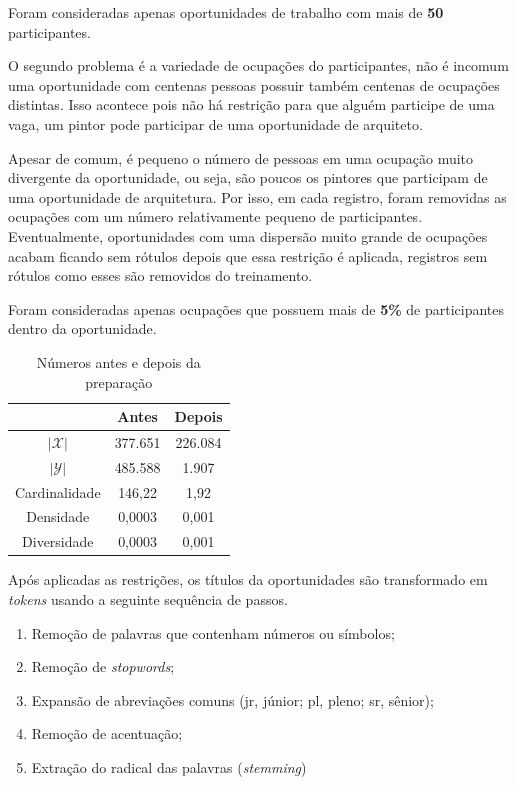 \documentclass[runningheads,a4paper]{llncs}
\begin{document}
Foram consideradas apenas oportunidades de trabalho com mais de \textbf{50} participantes.

O segundo problema é a variedade de ocupações do participantes, não é incomum uma oportunidade com centenas pessoas possuir também centenas de ocupações distintas. Isso acontece pois não há restrição para que alguém participe de uma vaga, um pintor pode participar de uma oportunidade de arquiteto.

Apesar de comum, é pequeno o número de pessoas em uma ocupação muito divergente da oportunidade, ou seja, são poucos os pintores que participam de uma oportunidade de arquitetura. Por isso, em cada registro, foram removidas as ocupações com um número relativamente pequeno de participantes. Eventualmente, oportunidades com uma dispersão muito grande de ocupações acabam ficando sem rótulos depois que essa restrição é aplicada, registros sem rótulos como esses são removidos do treinamento.

Foram consideradas apenas ocupações que possuem mais de \textbf{5\%} de participantes dentro da oportunidade.

\begin{table}
	\centering
	\begin{tabular}{| c | c | c |}
		\hline
		& \textbf{Antes} & \textbf{Depois} \\
		\hline
		$|\mathcal{X}|$ & 377.651 & 226.084 \\
		\hline
		$|\mathcal{Y}|$ & 485.588 & 1.907 \\
		\hline
		Cardinalidade & 146,22 & 1,92 \\
		\hline
		Densidade & 0,0003 & 0,001 \\
		\hline
		Diversidade & 0,0003 & 0,001 \\
		\hline
	\end{tabular}
	\caption{Números antes e depois da preparação}
	\label{tab:preparacao}
\end{table}

Após aplicadas as restrições, os títulos da oportunidades são transformado em \textit{tokens} usando a seguinte sequência de passos.

\begin{enumerate}
	\item Remoção de palavras que contenham números ou símbolos;
	\item Remoção de \textit{stopwords};
	\item Expansão de abreviações comuns (jr, júnior; pl, pleno; sr, sênior);
	\item Remoção de acentuação;
	\item Extração do radical das palavras (\textit{stemming})
\end{enumerate}
\end{document}

